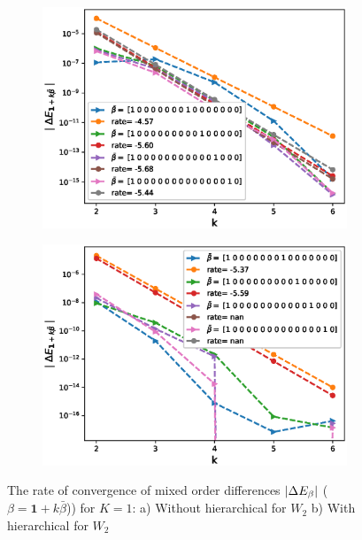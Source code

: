 \documentclass[11pt]{article}
\begin{document}
\begin{figure}[h!]
	\centering
	\begin{subfigure}{.5\textwidth}
		\centering
		\includegraphics[width=1\linewidth]{./figures/effect_H_differences/hierarchical/H_007/N_8/mixed_difference_order2_rbergomi_8steps_H_007_K_1_hierarch_with_rate_W2}
		\caption{}
		\label{fig:sub3}
	\end{subfigure}%
	\begin{subfigure}{.5\textwidth}
		\centering
		\includegraphics[width=1\linewidth]{./figures/effect_H_differences/total_hierarchical/mixed_difference_order2_rbergomi_8steps_H_007_K_1_totally_hierarch_with_rate_W2}
		\caption{}
		\label{fig:sub4}
	\end{subfigure}
	
	\caption{The rate of convergence of  mixed order differences $\left\lvert\Delta E_{\beta}\right\rvert$ ($\beta=\mathbf{1}+k \bar{\beta}$)) for $K=1$: a) Without hierarchical for $W_2$ b) With hierarchical for $W_2$}
	\label{fig:test2}
\end{figure}
\end{document}
